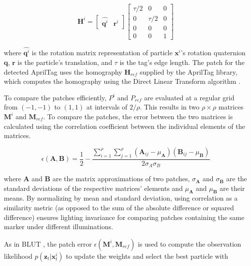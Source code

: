 \documentclass[letterpaper, 10 pt, conference]{ieeeconf}
\renewcommand{\vec}[1]{\boldsymbol{#1}}
\begin{document}
\begin{equation} \label{eq:particle_homography}
\vec{H}^i = \begin{bmatrix}
		\widehat{\vec{q}^i} & \vec{r}^i
	\end{bmatrix} \begin{bmatrix}
		\tau/2 & 0 & 0 \\
		0 & \tau/2 & 0 \\
		0 & 0 & 0 \\
		0 & 0 & 1
	\end{bmatrix}
\end{equation}



where $\widehat{\vec{q}^i}$ is the rotation matrix representation of particle $\vec{x}^i$'s rotation quaternion $\vec{q}$, $\vec{r}$ is the particle's translation, and $\tau$ is the tag's edge length. The patch for the detected AprilTag uses the homography $\vec{H}_{ref}$ supplied by the AprilTag library, which computes the homography using the Direct Linear Transform algorithm \cite{AprilTag}. 


To compare the patches efficiently, $P^i$ and $P_{ref}$ are evaluated at a regular grid from $(-1, -1)$ to $(1, 1)$ at intervals of $2 / \rho$. This results in two $\rho \times \rho$ matrices $\vec{M}^i$ and $\vec{M}_{ref}$. To compare the patches, the error between the two  matrices is calculated using the correlation coefficient between the individual elements of the matrices.

\begin{equation}
	\epsilon(\vec{A}, \vec{B}) = \frac{1}{2} - \frac{\sum_{i=1}^{\rho} \sum_{j=1}^{\rho} (\vec{A}_{ij} - \mu_{\vec{A}})(\vec{B}_{ij} - \mu_{\vec{B}}) }{2\sigma_{A} \sigma_{B}}
\end{equation}

where $\vec{A}$ and $\vec{B}$ are the matrix approximations of two patches, $\sigma_{\vec{A}}$ and $\sigma_{\vec{B}}$ are the standard deviations of the respective matrices' elements and $\mu_{\vec{A}}$ and $\mu_{\vec{B}}$ are their means. By normalizing by mean and standard deviation, using correlation as a similarity metric (as opposed to the sum of the absolute difference or squared difference) ensures lighting invariance for comparing patches containing the same marker under different illuminations.


As in BLUT \cite{BLUT}, the patch error $\epsilon(\vec{M}^{i}, \vec{M}_{ref})$ is used to compute the observation likelihood $p(\vec{z}_t|\vec{x}^i_t)$ to update the weights and select the best particle with
\end{document}
